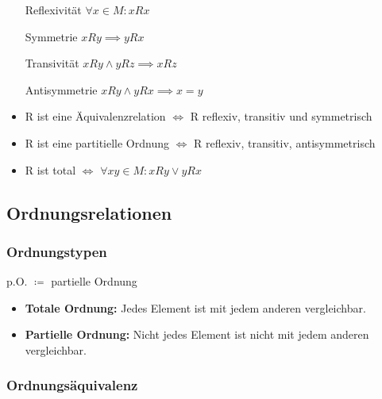 \documentclass[12pt]{scrreprt}
\begin{document}
                    \begin{itemize}
                        \item[Reflexivität] $ \forall x \in M : xRx $
                        \item[Symmetrie] $ xRy \implies yRx $
                        \item[Transivität] $ xRy \land yRz \implies xRz $
                        \item[Antisymmetrie] $ xRy \land yRx \implies x = y $
                    \end{itemize}

                    \begin{itemize}
                        \item R ist eine Äquivalenzrelation $ \iff $ R reflexiv, transitiv und symmetrisch
                        \item R ist eine partitielle Ordnung $ \iff $ R reflexiv, transitiv, antisymmetrisch
                        \item R ist total $ \iff $ $ \forall x y \in M : xRy \lor yRx $
                    \end{itemize}


            \subsection{Ordnungsrelationen}
                \label{ss:grundbegriffe_mengen_ordnungensrelationen}

                \subsubsection{Ordnungstypen}
                    \label{sss:grundbegriffe_mengen_ordnungensrelationen_typen}

                    p.O. $ \coloneqq $ partielle Ordnung

                    \begin{itemize}
                        \item \textbf{Totale Ordnung:} Jedes Element ist mit jedem anderen vergleichbar.
                        \item \textbf{Partielle Ordnung:} Nicht jedes Element ist nicht mit jedem anderen vergleichbar.
                    \end{itemize}


                \subsubsection{Ordnungsäquivalenz}
                    \label{sss:grundbegriffe_mengen_ordnungensrelationen_aequivalenz}
\end{document}
